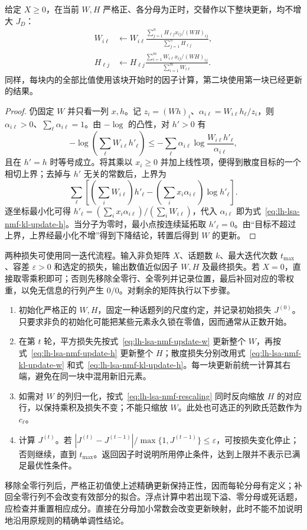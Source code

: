 \begin{theorem}[散度损失的乘法更新]
\label{thm:lh-lsa-nmf-kl-update}
给定 $X\geq0$，在当前 $W,H$ 严格正、各分母为正时，交替作以下整块更新，均不增大 $J_D$：
\begin{align}
W_{i\ell}&\leftarrow W_{i\ell}
\frac{\sum_{j=1}^n H_{\ell j}x_{ij}/(WH)_{ij}}
{\sum_{j=1}^n H_{\ell j}},
\label{eq:lh-lsa-nmf-kl-update-w}\\
H_{\ell j}&\leftarrow H_{\ell j}
\frac{\sum_{i=1}^m W_{i\ell}x_{ij}/(WH)_{ij}}
{\sum_{i=1}^m W_{i\ell}}.
\label{eq:lh-lsa-nmf-kl-update-h}
\end{align}
同样，每块内的全部比值使用该块开始时的因子计算，第二块使用第一块已经更新的结果。
\end{theorem}
\begin{proof}
仍固定 $W$ 并只看一列 $x,h$。记 $z_i=(Wh)_i$、$\alpha_{i\ell}=W_{i\ell}h_\ell/z_i$，则 $\alpha_{i\ell}>0$、$\sum_\ell\alpha_{i\ell}=1$。由 $-\log$ 的凸性，对 $h'>0$ 有
\[
-\log\!\left(\sum_\ell W_{i\ell}h'_\ell\right)
\leq-\sum_\ell\alpha_{i\ell}
\log\frac{W_{i\ell}h'_\ell}{\alpha_{i\ell}},
\]
且在 $h'=h$ 时等号成立。将其乘以 $x_i\geq0$ 并加上线性项，便得到散度目标的一个相切上界；去掉与 $h'$ 无关的常数后，上界为
\[
\sum_\ell\left[
\left(\sum_iW_{i\ell}\right)h'_\ell
-\left(\sum_ix_i\alpha_{i\ell}\right)\log h'_\ell\right].
\]
逐坐标最小化可得 $h'_\ell=(\sum_ix_i\alpha_{i\ell})/(\sum_iW_{i\ell})$，代入 $\alpha_{i\ell}$ 即为式~\eqref{eq:lh-lsa-nmf-kl-update-h}。当分子为零时，最小点按连续延拓取 $h'_\ell=0$。由“目标不超过上界，上界经最小化不增”得到下降结论，转置后得到 $W$ 的更新。
\end{proof}

两种损失可使用同一迭代流程。输入非负矩阵 $X$、话题数 $k$、最大迭代次数 $t_{\max}$、容差 $\varepsilon>0$ 和选定的损失，输出数值近似因子 $W,H$ 及最终损失。若 $X=0$，直接取零乘积即可；否则先移除全零行、全零列并记录位置，最后补回对应的零权重，以免无信息的行列产生 $0/0$。对剩余的矩阵执行以下步骤。
\begin{enumerate}
\item 初始化严格正的 $W,H$，固定一种话题列的尺度约定，并记录初始损失 $J^{(0)}$。只要求非负的初始化可能把某些元素永久锁在零值，因而通常从正数开始。
\item 在第 $t$ 轮，平方损失先按式~\eqref{eq:lh-lsa-nmf-update-w} 更新整个 $W$，再按式~\eqref{eq:lh-lsa-nmf-update-h} 更新整个 $H$；散度损失分别改用式~\eqref{eq:lh-lsa-nmf-kl-update-w} 和式~\eqref{eq:lh-lsa-nmf-kl-update-h}。每一块更新前统一计算其右端，避免在同一块中混用新旧元素。
\item 如需对 $W$ 的列归一化，按式~\eqref{eq:lh-lsa-nmf-rescaling} 同时反向缩放 $H$ 的对应行，以保持乘积及损失不变；不能只缩放 $W$。此处也可选正的列欧氏范数作为 $c_\ell$。
\item 计算 $J^{(t)}$。若 $|J^{(t)}-J^{(t-1)}|/\max\{1,J^{(t-1)}\}\leq\varepsilon$，可按损失变化停止；否则继续，直到 $t_{\max}$。返回因子时说明所用停止条件，达到上限并不表示已满足最优性条件。
\end{enumerate}
移除全零行列后，严格正初值使上述精确更新保持正性，因而每轮分母有定义；补回全零行列不会改变有效部分的拟合。浮点计算中若出现下溢、零分母或死话题，应检查并重置相应成分。直接在分母加小常数会改变更新映射，此时不能不加说明地沿用原规则的精确单调性结论。

